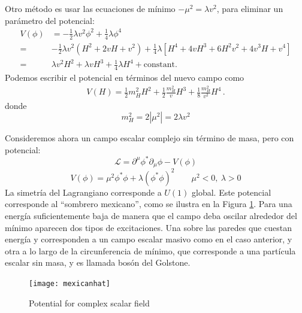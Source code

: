 \begin{frame}
Otro método es usar las ecuaciones de mínimo $-\mu^2=\lambda v^2$, para eliminar un parámetro del potencial:
\begin{align}
  V(\phi)&=-\tfrac{1}{2}\lambda v^2\phi^2+\tfrac{1}{4}\lambda\phi^4\nonumber\\
  =&-\tfrac{1}{2}\lambda v^2 \left(H^2+2vH+v^2\right)+\tfrac{1}{4}\lambda\left[H^4+4vH^3+6H^2v^2+4v^3H+v^4\right]\nonumber\\
  =&\lambda v^2H^2+\lambda vH^3+\tfrac{1}{4}\lambda H^4+\text{constant}.
\end{align}
Podemos escribir el potencial en términos del  nuevo campo como
\begin{align}
\label{eq:higgspot}
  V(H)=\frac{1}{2}m_H^2H^2+\frac{1}{2}\frac{m_H^2}{v}H^3+\frac{1}{8}\frac{m_H^2}{v^2} H^4\,.
\end{align}
donde
\begin{equation}
\label{eq:higgsmass}
  m_H^2=2\left|\mu^2\right|=2\lambda v^2
\end{equation}

Consideremos ahora un campo escalar complejo sin término de masa, pero con potencial:
\begin{equation}
  \label{eq:85qft}
  \mathcal{L}=\partial^\mu\phi^*\partial_\mu\phi-V(\phi)
\end{equation}
\begin{equation}
  V(\phi)=\mu^2\phi^*\phi+\lambda(\phi^*\phi)^2 
  \qquad 
  \mu^2\lt 0,\ \lambda\gt 0 
\end{equation}
La simetría del Lagrangiano corresponde a $U(1)$ global. Este potencial corresponde al ``sombrero mexicano'', como se ilustra en la Figura \ref{fig:mexicanhat}. Para una energía suficientemente baja de manera que el campo deba oscilar alrededor del mínimo aparecen dos tipos de excitaciones. Una sobre las paredes  que cuestan energía y corresponden a un campo escalar masivo como en el caso anterior, y otra a lo largo de la circunferencia de mínimo, que corresponde a una partícula escalar sin masa, y es llamada bosón del Golstone. 



\begin{figure}
  \centering
  \texttt{[image: mexicanhat]}
  \caption{Potential for complex scalar field}
  \label{fig:mexicanhat}
\end{figure}




\end{frame}
